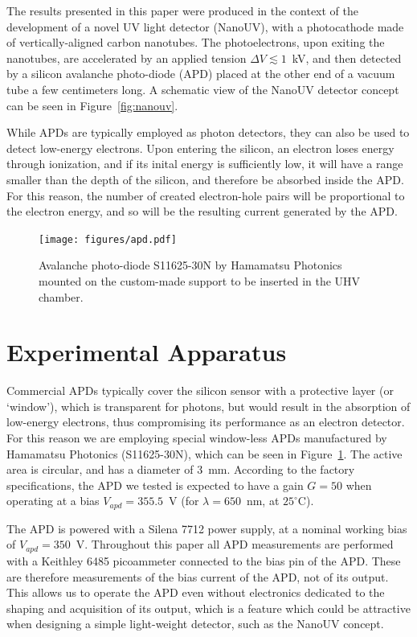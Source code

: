 \documentclass[12p]{paper}
\begin{document}
The results presented in this paper were produced in the context of the development of a novel UV light detector (NanoUV), with a photocathode made of vertically-aligned carbon nanotubes. The photoelectrons, upon exiting the nanotubes, are accelerated by an applied tension $\Delta V \lesssim 1$~kV, and then detected by a silicon avalanche photo-diode (APD) placed at the other end of a vacuum tube a few centimeters long. A schematic view of the NanoUV detector concept can be seen in Figure~\ref{fig:nanouv}. 

While APDs are typically employed as photon detectors, they can also be used to detect low-energy electrons. 
Upon entering the silicon, an electron loses energy through ionization, and if its inital energy is sufficiently low, it will have a range smaller than the depth of the silicon, and therefore be absorbed inside the APD. For this reason, the number of created electron-hole pairs will be proportional to the electron energy, and so will be the resulting current generated by the APD.

\begin{figure}[htb]
  \centering
  \texttt{[image: figures/apd.pdf]}
 \caption{Avalanche photo-diode S11625-30N by Hamamatsu Photonics mounted on the custom-made support to be inserted in the UHV chamber.
  \label{fig:apd}}
\end{figure}


\section{Experimental Apparatus}

Commercial APDs typically cover the silicon sensor with a protective layer (or `window'), which is transparent for photons, but would result in the absorption of low-energy electrons, thus compromising its performance as an electron detector. For this reason we are employing special window-less APDs manufactured by Hamamatsu Photonics (S11625-30N), which can be seen in Figure~\ref{fig:apd}. The active area is circular, and has a diameter of 3~mm. According to the factory specifications, the APD we tested is expected to have a gain $G = 50$ when operating at a bias $V_{apd} = 355.5$~V (for $\lambda = 650$~nm, at $25^{\circ}$C).

The APD is powered with a Silena 7712 power supply, at a nominal working bias of $V_{apd} = 350$~V. Throughout this paper all APD measurements are performed with a Keithley 6485 picoammeter connected to the bias pin of the APD. These are therefore measurements of the bias current of the APD, not of its output. This allows us to operate the APD even without electronics dedicated to the shaping and acquisition of its output, which is a feature which could be attractive when designing a simple light-weight detector, such as the NanoUV concept. 
\end{document}
